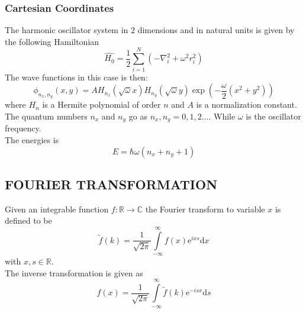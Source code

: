\documentclass[a4paper, hidelinks, 10pt]{article}
\let\oldsubsection\subsection
\renewcommand{\subsection}[1]{\centering \oldsubsection{{#1}} \justifying}
\newcommand{\md}{\mathrm{d}} %
\newcommand{\me}{\mathrm{e}} %
\newcommand{\rarr}{\rightarrow} %
\newcommand{\infint}{\int\limits^{\infty}_{-\infty}}
\begin{document}
\subsubsection{Cartesian Coordinates}
\label{ssub:Cartesian Coordinates}
    The harmonic oscillator system in $2$ dimensions and in natural units is
    given by the following Hamiltonian
        \begin{equation}
            \hat{H_0} = \frac{1}{2}\sum^N_{i=1}\left(-\nabla^2_i + \omega^2
            r^2_i\right)
            \label{eq:cartHarmOsc}
        \end{equation}
    The wave functions in this case is then:
        \begin{equation}
            \phi_{n_x,n_y}(x,y) =
            AH_{n_x}(\sqrt{\omega}x)H_{n_y}(\sqrt{\omega}y)
            \exp(-\frac{\omega}{2}(x^2+y^2))
            \label{eq:cartUarmOscWavef}
        \end{equation}
    where $H_n$ is a Hermite polynomial of order $n$ and $A$ is a normalization
    constant. The quantum numbers $n_x$ and $n_y$ go as $n_x,n_y=0,1,2\dots$.
    While $\omega$ is the oscillator frequency. \\
    The energies is 
        \begin{equation}
            E = \hbar\omega\left(n_x + n_y + 1\right)
            \label{eq:cartHarmOscE}
        \end{equation}

\subsection{FOURIER TRANSFORMATION}
\label{sub:fourier_transformation}
    Given an integrable function $f:\mathbb{R}\rarr\mathbb{C}$ the Fourier
    transform to variable $x$ is defined to be
        \begin{equation}
            \tilde{f}(k) = \frac{1}{\sqrt{2\pi}}\infint f(x)\me^{ixs} \md x
            \label{eq:FourierTransform}
        \end{equation}
    with $x,s\in\mathbb{R}$. \\
    The inverse transformation is given as
        \begin{equation}
            f(x) = \frac{1}{\sqrt{2\pi}}\infint \tilde{f}(k)\me^{-isx} \md s
            \label{eq:invFourier}
        \end{equation}
\end{document}
